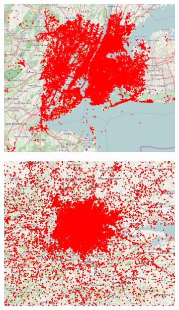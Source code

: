 \begin{figure}[!htbp]
	\medskip
	\centering
	\begin{subfigure}[htbp]{0.3\textwidth}
		\centering
		\includegraphics[width=1\linewidth]{figures/nyc_points.png}
		\caption{}
		\label{subfig:nyc_points}
	\end{subfigure}
	\quad
	\begin{subfigure}[htbp]{0.3\textwidth}
		\centering
		\includegraphics[width=1\linewidth]{figures/london_points.png}
		\caption{}
		\label{subfig:london_points}
	\end{subfigure}

\end{figure}

